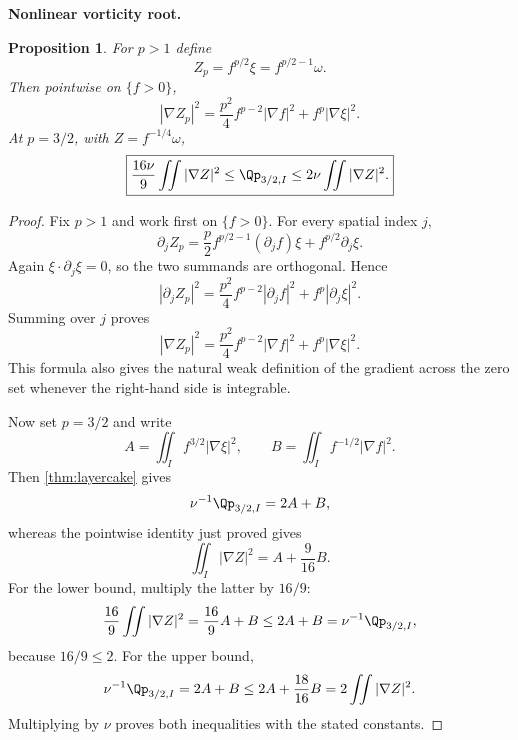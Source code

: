 \documentclass[11pt]{article}
\newtheorem{proposition}[theorem]{Proposition}
\theoremstyle{definition}\newtheorem{definition}[theorem]{Definition}
\theoremstyle{remark}\newtheorem{remark}[theorem]{Remark}
\begin{document}
\medskip
\noindent\textbf{Nonlinear vorticity root.}
\begin{proposition}\label{prop:root}
For $p>1$ define
\[
Z_p=f^{p/2}\xi=f^{p/2-1}\omega.
\]
Then pointwise on $\{f>0\}$,
\[
\boxed{|\nabla Z_p|^2=\frac{p^2}{4}f^{p-2}|\nabla f|^2+f^p|\nabla\xi|^2.}
\]
At $p=3/2$, with $Z=f^{-1/4}\omega$,
\[
\boxed{
\frac{16\nu}{9}\iint|\nabla Z|^2
\le \Qp_{3/2,I}
\le 2\nu\iint|\nabla Z|^2.
}
\]
\end{proposition}
\begin{proof}
Fix $p>1$ and work first on $\{f>0\}$.  For every spatial index $j$,
\[
\partial_jZ_p
=\frac p2 f^{p/2-1}(\partial_jf)\xi
+f^{p/2}\partial_j\xi.
\]
Again $\xi\cdot\partial_j\xi=0$, so the two summands are orthogonal.  Hence
\[
|\partial_jZ_p|^2
=\frac{p^2}{4}f^{p-2}|\partial_jf|^2
+f^p|\partial_j\xi|^2.
\]
Summing over $j$ proves
\[
|\nabla Z_p|^2
=\frac{p^2}{4}f^{p-2}|\nabla f|^2
+f^p|\nabla\xi|^2.
\]
This formula also gives the natural weak definition of the gradient across the
zero set whenever the right-hand side is integrable.

Now set $p=3/2$ and write
\[
A=\iint_I f^{3/2}|\nabla\xi|^2,
\qquad
B=\iint_I f^{-1/2}|\nabla f|^2.
\]
Then \cref{thm:layercake} gives
\[
\nu^{-1}\Qp_{3/2,I}=2A+B,
\]
whereas the pointwise identity just proved gives
\[
\iint_I|\nabla Z|^2=A+\frac9{16}B.
\]
For the lower bound, multiply the latter by $16/9$:
\[
\frac{16}{9}\iint|\nabla Z|^2
=\frac{16}{9}A+B
\le2A+B
=\nu^{-1}\Qp_{3/2,I},
\]
because $16/9\le2$.  For the upper bound,
\[
\nu^{-1}\Qp_{3/2,I}=2A+B
\le2A+\frac{18}{16}B
=2\iint|\nabla Z|^2.
\]
Multiplying by $\nu$ proves both inequalities with the stated constants.
\end{proof}
\end{document}
